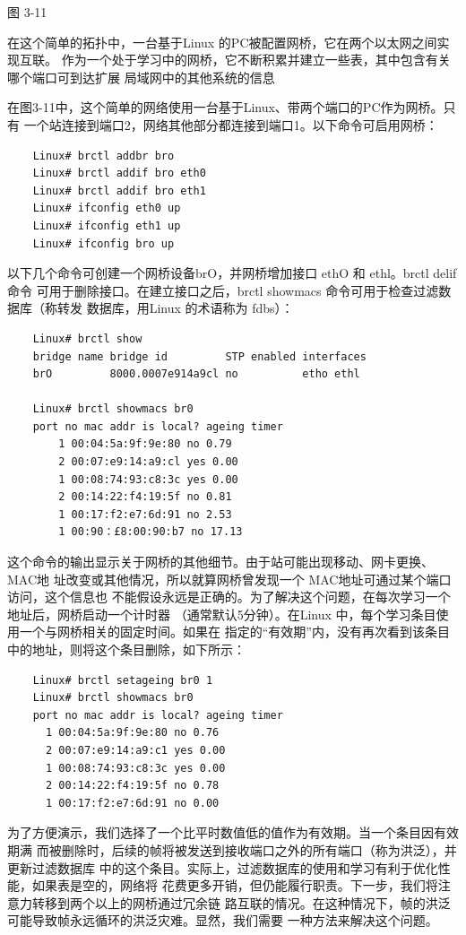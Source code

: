 图 3-11

在这个简单的拓扑中，一台基于Linux 的PC被配置网桥，它在两个以太网之间实现互联。
作为一个处于学习中的网桥，它不断积累并建立一些表，其中包含有关哪个端口可到达扩展
局域网中的其他系统的信息

在图3-11中，这个简单的网络使用一台基于Linux、带两个端口的PC作为网桥。只有
一个站连接到端口2，网络其他部分都连接到端口1。以下命令可启用网桥：
\begin{verbatim}
    Linux# brctl addbr bro
    Linux# brctl addif bro eth0
    Linux# brctl addif bro eth1
    Linux# ifconfig eth0 up
    Linux# ifconfig eth1 up
    Linux# ifconfig bro up
\end{verbatim}

以下几个命令可创建一个网桥设备brO，并网桥增加接口 ethO 和 ethl。brctl delif 命令
可用于删除接口。在建立接口之后，brctl showmacs 命令可用于检查过滤数据库（称转发
数据库，用Linux 的术语称为 fdbs）：

\begin{verbatim}
    Linux# brctl show
    bridge name bridge id         STP enabled interfaces
    brO         8000.0007e914a9cl no          etho ethl
    
    Linux# brctl showmacs br0
    port no mac addr is local? ageing timer
        1 00:04:5a:9f:9e:80 no 0.79
        2 00:07:e9:14:a9:cl yes 0.00
        1 00:08:74:93:c8:3c yes 0.00
        2 00:14:22:f4:19:5f no 0.81
        1 00:17:f2:e7:6d:91 no 2.53
        1 00:90：£8:00:90:b7 no 17.13
\end{verbatim}

这个命令的输出显示关于网桥的其他细节。由于站可能出现移动、网卡更换、MAC地
址改变或其他情况，所以就算网桥曾发现一个 MAC地址可通过某个端口访问，这个信息也
不能假设永远是正确的。为了解决这个问题，在每次学习一个地址后，网桥启动一个计时器
（通常默认5分钟）。在Linux 中，每个学习条目使用一个与网桥相关的固定时间。如果在
指定的“有效期”内，没有再次看到该条目中的地址，则将这个条目删除，如下所示：

\begin{verbatim}
    Linux# brctl setageing br0 1
    Linux# brctl showmacs br0
    port no mac addr is local? ageing timer
      1 00:04:5a:9f:9e:80 no 0.76
      2 00:07:e9:14:a9:c1 yes 0.00
      1 00:08:74:93:c8:3c yes 0.00
      2 00:14:22:f4:19:5f no 0.78
      1 00:17:f2:e7:6d:91 no 0.00
\end{verbatim}

为了方便演示，我们选择了一个比平时数值低的值作为有效期。当一个条目因有效期满
而被删除时，后续的帧将被发送到接收端口之外的所有端口（称为洪泛），并更新过滤数据库
中的这个条目。实际上，过滤数据库的使用和学习有利于优化性能，如果表是空的，网络将
花费更多开销，但仍能履行职责。下一步，我们将注意力转移到两个以上的网桥通过冗余链
路互联的情况。在这种情况下，帧的洪泛可能导致帧永远循环的洪泛灾难。显然，我们需要
一种方法来解决这个问题。

